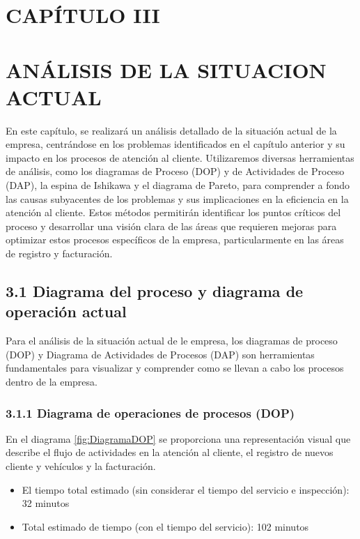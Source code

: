 \newpage
\section{CAPÍTULO III}
\section*{ANÁLISIS DE LA SITUACION ACTUAL}
En este capítulo, se realizará un análisis detallado de la situación actual de la empresa, centrándose en los problemas identificados en el capítulo anterior y su impacto en los procesos de atención al cliente. Utilizaremos diversas herramientas de análisis, como los diagramas de Proceso (DOP)  y de Actividades de Proceso (DAP), la espina de Ishikawa y el diagrama de Pareto, para comprender a fondo las causas subyacentes de los problemas y sus implicaciones en la eficiencia en la atención al cliente. Estos métodos permitirán identificar los puntos críticos del proceso y desarrollar una visión clara de las áreas que requieren mejoras para optimizar estos procesos específicos de la empresa, particularmente en las áreas de registro y facturación.

\subsection{3.1 Diagrama del proceso y diagrama de operación actual}
Para el análisis de la situación actual de le empresa, los diagramas de proceso (DOP) y Diagrama de Actividades de Procesos (DAP) son herramientas fundamentales para visualizar y comprender como se llevan a cabo los procesos dentro de la empresa.

\subsubsection*{3.1.1 Diagrama de operaciones de procesos (DOP)}
En el diagrama \ref{fig:DiagramaDOP} se proporciona una representación visual que describe el flujo de actividades en la atención al cliente, el registro de nuevos cliente y vehículos y la facturación. 
\begin{itemize}
    \item El tiempo total estimado (sin considerar el tiempo del servicio e inspección): 32 minutos
    \item Total estimado de tiempo (con el tiempo del servicio): 102 minutos
\end{itemize}



